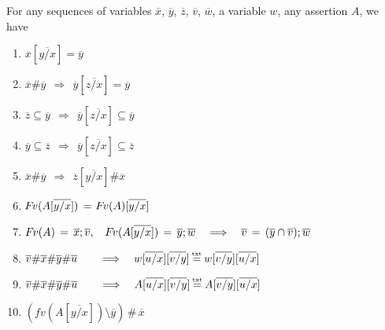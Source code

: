 \begin{lemma}
\label{l:sfs}
For any sequences of variables $\overline x$, $\overline y$, $\overline z$, $\overline v$, $\overline w$, a variable $w$, any assertion $A$, we have
\begin{enumerate}
\item
\label{l:sfs:zero}
$ \overline x[\overline{y/x} ] = \overline y $
\item
\label{l:sfs:zero:one}
$ \overline {x} \# \overline y \ \   \Rightarrow \ \  \overline y[\overline{z / x} ] = \overline y $
\item
\label{l:sfs:one}
$\overline {z} \subseteq \overline y \ \   \Rightarrow \ \  \overline y[\overline{z / x} ] \subseteq \overline y $
\item
\label{l:sfs:two}
$\overline {y} \subseteq \overline z \ \   \Rightarrow \ \  \overline y[\overline{z / x} ] \subseteq \overline z $
\item
\label{l:sfs:three}
 $\overline x \# \overline y \ \ \Rightarrow \ \ {\overline z}[\overline{y / x}]  \# \overline x $ 
 \item
 \label{l:sfs:four}
 ${\hspace{-1pt}F\hspace{-1pt}}v(A[\overline{y / x}] )\, =\, {\hspace{-1pt}F\hspace{-1pt}}v(A)[\overline{y / x}] $
 \item
 \label{l:sfs:five}
 $\fv(A)\, =\, \overline x; \overline v, \ \ \   \fv(A[\overline{y / x}] )\, = \,   \overline y; \overline w 
 \ \ \ \Longrightarrow\ \ \ 
 \overline v \, = \, (\overline {y}\cap\overline{v}); \overline w $
  \item
  \label{l:sfs:sixa}
 $ \overline v \# \overline x   \# \overline y   \# \overline u  \ \ \    \ \ \ \Longrightarrow\ \ \ 
w[ \overline {u/x} ][ \overline {v/y} ]  \txteq w[ \overline {v/y} ][ \overline {u/x} ]  $

 \item
  \label{l:sfs:six}
 $ \overline v \# \overline x   \# \overline y   \# \overline u  \ \ \    \ \ \ \Longrightarrow\ \ \ 
A[ \overline {u/x} ][ \overline {v/y} ]  \txteq A[ \overline {v/y} ][ \overline {u/x} ]  $
\item
  \label{l:sfs:seven}
 $( fv (A[ \overline {y/x} ])\setminus \overline y)\, \# \, \overline x$
\end{enumerate}

\end{lemma}

